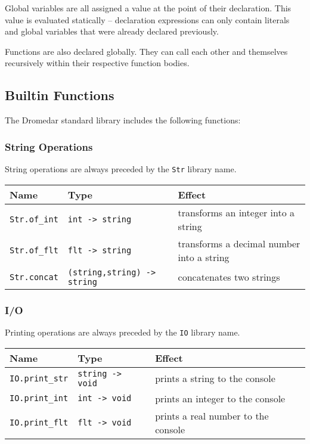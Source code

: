 \documentclass{article}
\newcommand{\code}[1]{\lstinline[columns=fixed]{#1}}
\begin{document}
			Global variables are all assigned a value at the point of their declaration. This value is evaluated statically -- declaration expressions can only contain literals and global variables that were already declared previously.
			
			Functions are also declared globally. They can call each other and themselves recursively within their respective function bodies.
			
		\subsection{Builtin Functions}
		
			The Dromedar standard library includes the following functions:
			
			\subsubsection{String Operations}
			
				String operations are always preceded by the \code{Str} library name.
			
				\begin{longtable}{l|l|l}
					\textbf{Name} & \textbf{Type} & \textbf{Effect} \\
					\midrule
					\code{Str.of_int} & \code{int -> string} & transforms an integer into a string \\
					\code{Str.of_flt} & \code{flt -> string} & transforms a decimal number into a string \\
					\code{Str.concat} & \code{(string,string) -> string} & concatenates two strings
				\end{longtable}
			
			\subsubsection{I/O}
			
				Printing operations are always preceded by the \code{IO} library name.
			
				\begin{longtable}{l|l|l}
					\textbf{Name} & \textbf{Type} & \textbf{Effect} \\
					\midrule
					\code{IO.print_str} & \code{string -> void} & prints a string to the console\\
					\code{IO.print_int} & \code{int -> void} & prints an integer to the console\\
					\code{IO.print_flt} & \code{flt -> void} & prints a real number to the console
				\end{longtable}
		
\end{document}
